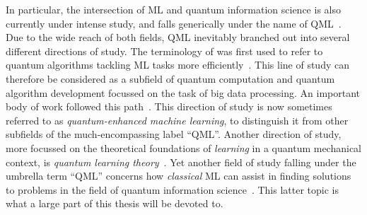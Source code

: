 In particular, the intersection of \ac{ML} and quantum information science is also currently under intense study, and falls generically under the name of \ac{QML}~\cite{wittek2014quantum,schuld2014introduction,adcock2015advances,biamonte2017quantum}.
Due to the wide reach of both fields, \ac{QML} inevitably branched out into several different directions of study.
The terminology of was first used to refer to quantum algorithms tackling \ac{ML} tasks more efficiently~\cite{giovannetti2008quantum,harrow2009quantum,lloyd2013quantum,lloyd2014quantum,rebentrost2014quantum,lloyd2016quantum,rebentrost2018quantum,rebentrost2016quantum}. This line of study can therefore be considered as a subfield of quantum computation and quantum algorithm development focussed on the task of big data processing. An important body of work followed this path~\cite{wittek2014quantum,schuld2014introduction,dunjko2017machine,ciliberto2018quantum,schuld2018supervised,perdomo-ortiz2018opportunities}. This direction of study is now sometimes referred to as \emph{quantum-enhanced machine learning}, to distinguish it from other subfields of the much-encompassing label ``\ac{QML}''.
Another direction of study, more focussed on the theoretical foundations of \emph{learning} in a quantum mechanical context, is \emph{quantum learning theory}~\cite{aaronson2007learnability,aaronson2017shadow,arunachalam2017survey,aaronson2018online,rocchetto2019experimental}.
Yet another field of study falling under the umbrella term ``\ac{QML}'' concerns how \emph{classical} \ac{ML} can assist in finding solutions to problems in the field of quantum information science~\cite{zdeborov2017machine,spears2018deep,carleo2019machine}.
This latter topic is what a large part of this thesis will be devoted to.

